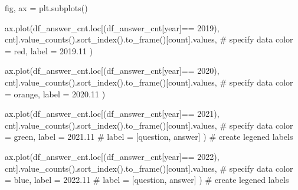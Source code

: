 \documentclass[
  letterpaper,
  DIV=11,
  numbers=noendperiod]{scrartcl}
\newenvironment{Shaded}{\begin{snugshade}}{\end{snugshade}}
\newcommand{\CommentTok}[1]{\textcolor[rgb]{0.37,0.37,0.37}{#1}}
\newcommand{\NormalTok}[1]{\textcolor[rgb]{0.00,0.23,0.31}{#1}}
\newcommand{\OperatorTok}[1]{\textcolor[rgb]{0.37,0.37,0.37}{#1}}
\newcommand{\StringTok}[1]{\textcolor[rgb]{0.13,0.47,0.30}{#1}}
\begin{document}
\begin{Shaded}
\begin{Highlighting}[]
\NormalTok{fig, ax }\OperatorTok{=}\NormalTok{ plt.subplots()}


\NormalTok{ax.plot(df\_answer\_cnt.loc[(df\_answer\_cnt[}\StringTok{\textquotesingle{}year\textquotesingle{}}\NormalTok{]}\OperatorTok{==} \StringTok{\textquotesingle{}2019\textquotesingle{}}\NormalTok{), }\StringTok{\textquotesingle{}cnt\textquotesingle{}}\NormalTok{].value\_counts().sort\_index().to\_frame()[}\StringTok{\textquotesingle{}count\textquotesingle{}}\NormalTok{].values, }\CommentTok{\# specify data}
\NormalTok{        color }\OperatorTok{=} \StringTok{\textquotesingle{}red\textquotesingle{}}\NormalTok{,}
\NormalTok{        label }\OperatorTok{=} \StringTok{\textquotesingle{}2019.11\textquotesingle{}}
\NormalTok{) }

\NormalTok{ax.plot(df\_answer\_cnt.loc[(df\_answer\_cnt[}\StringTok{\textquotesingle{}year\textquotesingle{}}\NormalTok{]}\OperatorTok{==} \StringTok{\textquotesingle{}2020\textquotesingle{}}\NormalTok{), }\StringTok{\textquotesingle{}cnt\textquotesingle{}}\NormalTok{].value\_counts().sort\_index().to\_frame()[}\StringTok{\textquotesingle{}count\textquotesingle{}}\NormalTok{].values, }\CommentTok{\# specify data}
\NormalTok{        color }\OperatorTok{=} \StringTok{\textquotesingle{}orange\textquotesingle{}}\NormalTok{,}
\NormalTok{        label }\OperatorTok{=} \StringTok{\textquotesingle{}2020.11\textquotesingle{}}
\NormalTok{) }

\NormalTok{ax.plot(df\_answer\_cnt.loc[(df\_answer\_cnt[}\StringTok{\textquotesingle{}year\textquotesingle{}}\NormalTok{]}\OperatorTok{==} \StringTok{\textquotesingle{}2021\textquotesingle{}}\NormalTok{), }\StringTok{\textquotesingle{}cnt\textquotesingle{}}\NormalTok{].value\_counts().sort\_index().to\_frame()[}\StringTok{\textquotesingle{}count\textquotesingle{}}\NormalTok{].values, }\CommentTok{\# specify data}
\NormalTok{        color }\OperatorTok{=} \StringTok{\textquotesingle{}green\textquotesingle{}}\NormalTok{,}
\NormalTok{        label }\OperatorTok{=} \StringTok{\textquotesingle{}2021.11\textquotesingle{}}
\CommentTok{\# label = [\textquotesingle{}question\textquotesingle{}, \textquotesingle{}answer\textquotesingle{}]}
\NormalTok{) }\CommentTok{\# create legened labels}

\NormalTok{ax.plot(df\_answer\_cnt.loc[(df\_answer\_cnt[}\StringTok{\textquotesingle{}year\textquotesingle{}}\NormalTok{]}\OperatorTok{==} \StringTok{\textquotesingle{}2022\textquotesingle{}}\NormalTok{), }\StringTok{\textquotesingle{}cnt\textquotesingle{}}\NormalTok{].value\_counts().sort\_index().to\_frame()[}\StringTok{\textquotesingle{}count\textquotesingle{}}\NormalTok{].values, }\CommentTok{\# specify data}
\NormalTok{        color }\OperatorTok{=} \StringTok{\textquotesingle{}blue\textquotesingle{}}\NormalTok{,}
\NormalTok{         label }\OperatorTok{=} \StringTok{\textquotesingle{}2022.11\textquotesingle{}}
        \CommentTok{\# label = [\textquotesingle{}question\textquotesingle{}, \textquotesingle{}answer\textquotesingle{}]}
\NormalTok{        ) }\CommentTok{\# create legened labels}


\end{Highlighting}
\end{Shaded}
\end{document}

